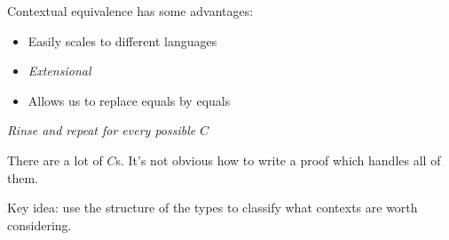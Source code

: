 \documentclass{beamer}
\begin{document}
\begin{frame}
  Contextual equivalence has some advantages:
  \begin{itemize}
  \item Easily scales to different languages
  \item \emph{Extensional}
  \item Allows us to replace equals by equals
  \end{itemize}
\end{frame}

\begin{frame}
  \begin{center}
    \it Rinse and repeat for every possible $C$
  \end{center}
  \pause
  There are a lot of $C$s.
  \pause
  It's not obvious how to write a proof which handles all of them.
\end{frame}

\begin{frame}
  \centering
  Key idea: use the structure of the types to classify what contexts
  are worth considering.
\end{frame}
\end{document}
